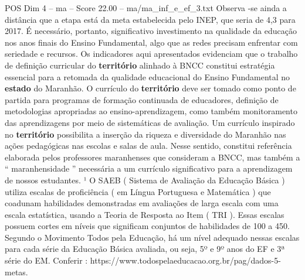 \begin{textsample}{POS Dim 4 – ma – Score 22.00 – ma/ma\_inf\_e\_ef\_3.txt}
Observa -se ainda a distância que a etapa está da meta estabelecida pelo INEP, que seria de 4,3 para 2017.
É necessário, portanto, significativo investimento na qualidade da educação nos anos finais do Ensino Fundamental, algo que as redes precisam enfrentar com seriedade e recursos.
Os indicadores aqui apresentados evidenciam que o trabalho de definição curricular do \textbf{território} alinhado à BNCC constitui estratégia essencial para a retomada da qualidade educacional do Ensino Fundamental no \textbf{estado} do Maranhão.
O currículo do \textbf{território} deve ser tomado como ponto de partida para programas de formação continuada de educadores, definição de metodologias apropriadas ao ensino-aprendizagem, como também monitoramento das aprendizagens por meio de sistemáticas de avaliação.
Um currículo inspirado no \textbf{território} possibilita a inserção da riqueza e diversidade do Maranhão nas ações pedagógicas nas escolas e salas de aula.
Nesse sentido, constitui referência elaborada pelos professores maranhenses que consideram a BNCC, mas também a “ maranhensidade ” necessária a um currículo significativo para a aprendizagem de nossos estudantes. ¹ O SAEB ( Sistema de Avaliação da Educação Básica ) utiliza escalas de proficiência ( em Língua Portuguesa e Matemática ) que coadunam habilidades demonstradas em avaliações de larga escala com uma escala estatística, usando a Teoria de Resposta ao Item ( TRI ).
Essas escalas possuem cortes em níveis que significam conjuntos de habilidades de 100 a 450.
Segundo o Movimento Todos pela Educação, há um nível adequado nessas escalas para cada série da Educação Básica avaliada, ou seja, 5º e 9º anos do EF e 3ª série do EM.
Conferir : https://www.todospelaeducacao.org.br/pag/dados-5-metas.

\end{textsample}
